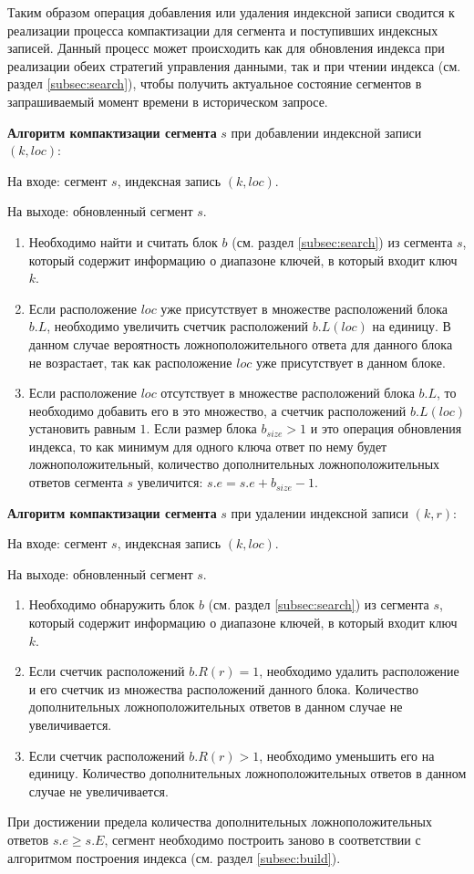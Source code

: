 Таким образом операция добавления или удаления индексной записи сводится к реализации процесса компактизации для сегмента и поступивших индексных записей. Данный процесс может происходить как для обновления индекса при реализации обеих стратегий управления данными, так и при чтении индекса (см. раздел \ref{subsec:search}), чтобы получить актуальное состояние сегментов в запрашиваемый момент времени в историческом запросе.

\textbf{Алгоритм компактизации сегмента} $s$ при добавлении индексной записи $(k, loc)$:

На входе: сегмент $s$, индексная запись $(k, loc)$.

На выходе: обновленный сегмент $s$.
\begin{enumerate}
\item Необходимо найти и считать блок $b$ (см. раздел \ref{subsec:search}) из сегмента $s$, который содержит информацию о диапазоне ключей, в который входит ключ $k$.
\item Если расположение $loc$ уже присутствует в множестве расположений блока $b.L$, необходимо увеличить счетчик расположений $b.L(loc)$ на единицу. В данном случае вероятность ложноположительного ответа для данного блока не возрастает, так как расположение $loc$ уже присутствует в данном блоке.
\item Если расположение $loc$ отсутствует в множестве расположений блока $b.L$, то необходимо добавить его в это множество, а счетчик расположений $b.L(loc)$ установить равным $1$. Если размер блока $b_{size} > 1$ и это операция обновления индекса, то как минимум для одного ключа ответ по нему будет ложноположительный, количество дополнительных ложноположительных ответов сегмента $s$ увеличится: $s.e = s.e + b_{size} - 1$.   
\end{enumerate}

\textbf{Алгоритм компактизации сегмента} $s$ при удалении индексной записи $(k, r)$:

На входе: сегмент $s$, индексная запись $(k, loc)$.

На выходе: обновленный сегмент $s$.
\begin{enumerate}
\item Необходимо обнаружить блок $b$ (см. раздел \ref{subsec:search}) из сегмента $s$, который содержит информацию о диапазоне ключей, в который входит ключ $k$.
\item Если счетчик расположений $b.R(r) = 1$, необходимо удалить расположение и его счетчик из множества расположений данного блока. Количество дополнительных ложноположительных ответов в данном случае не увеличивается.
\item Если счетчик расположений $b.R(r) > 1$, необходимо уменьшить его на единицу. Количество дополнительных ложноположительных ответов в данном случае не увеличивается.
\end{enumerate}

При достижении предела количества дополнительных ложноположительных ответов $s.e \geq s.E$, сегмент необходимо построить заново в соответствии с алгоритмом построения индекса (см. раздел \ref{subsec:build}).
